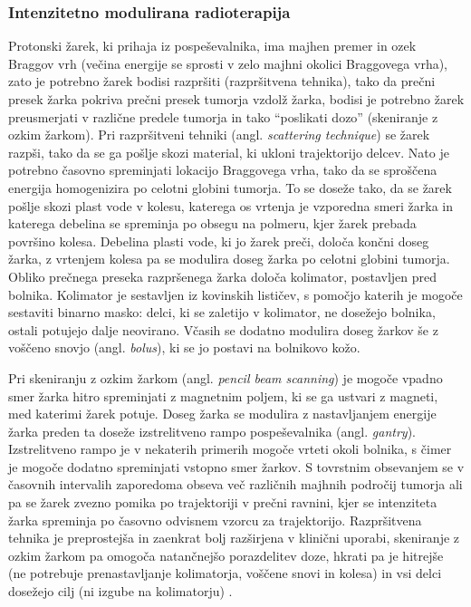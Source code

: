 \documentclass[a4paper,twoside,11pt]{article}
\begin{document}
	\subsubsection*{Intenzitetno modulirana radioterapija}
	\par{
	  Protonski žarek, ki prihaja iz pospeševalnika, ima majhen premer in ozek Braggov vrh (večina energije se sprosti v zelo majhni okolici Braggovega vrha), zato je potrebno žarek bodisi razpršiti (razpršitvena tehnika), tako da prečni presek žarka pokriva prečni presek tumorja vzdolž žarka, bodisi je potrebno žarek preusmerjati v različne predele tumorja in tako ``poslikati dozo'' (skeniranje z ozkim žarkom). Pri razpršitveni tehniki (angl. \emph{scattering technique}) se žarek razpši, tako da se ga pošlje skozi material, ki ukloni trajektorijo delcev. Nato je potrebno časovno spreminjati lokacijo Braggovega vrha, tako da se sproščena energija homogenizira po celotni globini tumorja. To se doseže tako, da se žarek pošlje skozi plast vode v kolesu, katerega os vrtenja je vzporedna smeri žarka in katerega debelina se spreminja po obsegu na polmeru, kjer žarek prebada površino kolesa. Debelina plasti vode, ki jo žarek preči, določa končni doseg žarka, z vrtenjem kolesa pa se modulira doseg žarka po celotni globini tumorja. Obliko prečnega preseka razpršenega žarka določa kolimator, postavljen pred bolnika. Kolimator je sestavljen iz kovinskih lističev, s pomočjo katerih je mogoče sestaviti binarno masko: delci, ki se zaletijo v kolimator, ne dosežejo bolnika, ostali potujejo dalje neovirano. Včasih se dodatno modulira doseg žarkov še z voščeno snovjo (angl. \emph{bolus}), ki se jo postavi na bolnikovo kožo.
	}
	\par{
	  Pri skeniranju z ozkim žarkom (angl. \emph{pencil beam scanning}) je mogoče vpadno smer žarka hitro spreminjati z magnetnim poljem, ki se ga ustvari z magneti, med katerimi žarek potuje. Doseg žarka se modulira z nastavljanjem energije žarka preden ta doseže izstrelitveno rampo pospeševalnika (angl. \emph{gantry}). Izstrelitveno rampo je v nekaterih primerih mogoče vrteti okoli bolnika, s čimer je mogoče dodatno spreminjati vstopno smer žarkov. S tovrstnim obsevanjem se v časovnih intervalih zaporedoma obseva več različnih majhnih področij tumorja ali pa se žarek zvezno pomika po trajektoriji v prečni ravnini, kjer se intenziteta žarka spreminja po časovno odvisnem vzorcu za trajektorijo. Razpršitvena tehnika je preprostejša in zaenkrat bolj razširjena v klinični uporabi, skeniranje z ozkim žarkom pa omogoča natančnejšo porazdelitev doze, hkrati pa je hitrejše (ne potrebuje prenastavljanje kolimatorja, voščene snovi in kolesa) in vsi delci dosežejo cilj (ni izgube na kolimatorju) \citep{schippers2011}.
	}
\end{document}
